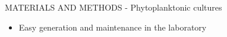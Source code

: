 \documentclass[handout]{beamer}
\newcommand\Fontable{\fontsize{9}{10}\selectfont}
\begin{document}
\begin{frame}{MATERIALS AND METHODS - Phytoplanktonic cultures}
\begin{minipage}[c]{1\linewidth}
\begin{minipage}[c]{0.7\linewidth}
\begin{itemize}
	\Fontable
	\item<3-> Easy generation and maintenance in the laboratory
\end{itemize}
\end{minipage}
\begin{minipage}[c]{0.29\linewidth}
\end{minipage}
\end{minipage}


\end{frame}
\end{document}
